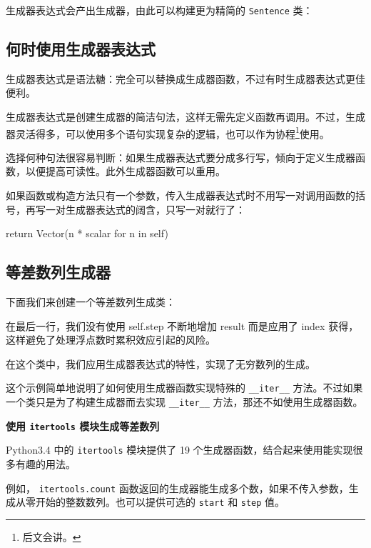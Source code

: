 生成器表达式会产出生成器，由此可以构建更为精简的 \texttt{Sentence} 类：



\subsection{何时使用生成器表达式}

生成器表达式是语法糖：完全可以替换成生成器函数，不过有时生成器表达式更佳便利。

生成器表达式是创建生成器的简洁句法，这样无需先定义函数再调用。不过，生成器灵活得多，可以使用多个语句实现复杂的逻辑，也可以作为协程\footnote{后文会讲。}使用。

选择何种句法很容易判断：如果生成器表达式要分成多行写，倾向于定义生成器函数，以便提高可读性。此外生成器函数可以重用。

如果函数或构造方法只有一个参数，传入生成器表达式时不用写一对调用函数的括号，再写一对生成器表达式的阔含，只写一对就行了：

\begin{python}
    return Vector(n * scalar for n in self)
\end{python}

\subsection{等差数列生成器}

下面我们来创建一个等差数列生成类：



在最后一行，我们没有使用 self.step 不断地增加 result 而是应用了 index 获得，这样避免了处理浮点数时累积效应引起的风险。

在这个类中，我们应用生成器表达式的特性，实现了无穷数列的生成。

这个示例简单地说明了如何使用生成器函数实现特殊的 \texttt{\_\_iter\_\_} 方法。不过如果一个类只是为了构建生成器而去实现 \texttt{\_\_iter\_\_} 方法，那还不如使用生成器函数。



\noindent\textbf{使用 \texttt{itertools} 模块生成等差数列}

Python3.4 中的 \texttt{itertools} 模块提供了 19 个生成器函数，结合起来使用能实现很多有趣的用法。

例如， \texttt{itertools.count} 函数返回的生成器能生成多个数，如果不传入参数，生成从零开始的整数数列。也可以提供可选的 \texttt{start} 和 \texttt{step} 值。

